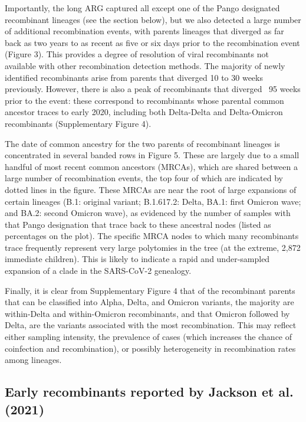 \documentclass{article}
\begin{document}
Importantly, the long ARG captured all except one of the Pango designated
recombinant lineages (see the section below), but we also detected a large
number of additional recombination events, with parents lineages that diverged
as far back as two years to as recent as five or six days prior to the
recombination event (Figure 3). This provides a degree of resolution of viral
recombinants not available with other recombination detection methods. The
majority of newly identified recombinants arise from parents that diverged 10
to 30 weeks previously. However, there is also a peak of recombinants that
diverged ~95 weeks prior to the event: these correspond to recombinants whose
parental common ancestor traces to early 2020, including both Delta-Delta and
Delta-Omicron recombinants (Supplementary Figure 4).

The date of common ancestry for the two parents of recombinant lineages is
concentrated in several banded rows in Figure 5. These are largely due to a
small handful of most recent common ancestors (MRCAs), which are shared between
a large number of recombination events, the top four of which are indicated by
dotted lines in the figure. These MRCAs are near the root of large expansions
of certain lineages (B.1: original variant;  B.1.617.2: Delta, BA.1: first
Omicron wave; and BA.2: second Omicron wave), as evidenced by the number of
samples with that Pango designation that trace back to these ancestral nodes
(listed as percentages on the plot). The specific MRCA nodes to which many
recombinants trace frequently represent very large polytomies in the tree (at
the extreme, 2,872 immediate children). This is likely to indicate a rapid and
under-sampled expansion of a clade in the SARS-CoV-2 genealogy.

Finally, it is clear from Supplementary Figure 4 that of the recombinant
parents that can be classified into Alpha, Delta, and Omicron variants, the
majority are within-Delta and within-Omicron recombinants, and that Omicron
followed by Delta, are the variants associated with the most recombination.
This may reflect either sampling intensity, the prevalence of cases (which
increases the chance of coinfection and recombination), or possibly
heterogeneity in recombination rates among lineages.

\subsection{Early recombinants reported by Jackson et al. (2021)}
\end{document}
